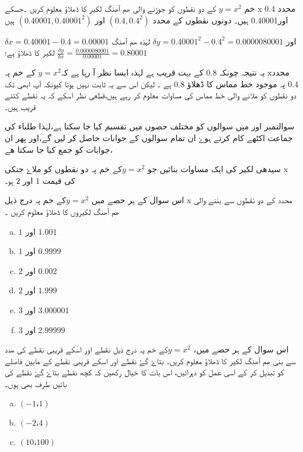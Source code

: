خم \( y=x^{2}\) کے دو نقطوں کو جوڑنے والی ھم آھنگ لکیر کا ڈھلاؤ معلوم کریں ۔جسکے x محدد 0.4 اور0.40001 ہیں۔
دونوں نقطوں کے محدد  \( ( 0.4,0.4^{2} ) \)  اور            \( (0.40001 , 0.40001^{2}) \)           ہیں 

\( \delta x = 0.40001-0.4=0.00001\)  اور   \(\delta y =0.40001^{2}-0.4^{2}=0.0000080001\)
لہٰذہ ھم آھنگ لکیر کا ڈھلاؤ ہے؛
      \(\frac{\delta y}{\delta x}=\frac{0.0000080001}{0.00001}=0.80001\)          

یہ نتیجہ چونکہ 0.8 کے بہت قریب ہے لہٰذہ ایسا نظر آ رہا ہے کہ\( y=x^{2} \) کے خم پہ xمحدد  0.4 پہ موجود     خط مماس کا ڈھلاؤ  0.8 ہے ۔ لیکن اس سے یہ ثابت نہیں ہوتا کیونکہ آپ ابھی تک دو نقطوں کو ملانے والی خط مماس کی مساوات معلوم کر رہے ہیں،قطعی نظر اسکے کہ یہ نقطے کتنے قریب ہیں۔


سوالنمبر اور میں سوالوں کو مختلف حصوں میں تقسیم کیا جا سکتا ہے،لہٰذا طلباء کی جماعت اکٹھے کام کرتے ہوۓ ان تمام سوالوں کے جوابات حاصل کر لیں گے،اور پھر ان جوابات کو جمع کیا جا سکتا ھے،

سیدھی لکیر کی ایک مساوات بنائیں جو \( y=x^{2} \)کے خم پہ دو نقطوں کو ملاۓ جنکی x کی قیمت 1 اور 2 ہو۔




اس سوال کے ہر حصے میں  \( y=x^{2} \)کے خم پہ  درج ذیل  x محدد  کے  دو نقطوں  سے بننے والی ھم آھنگ لکیروں کا ڈھلاؤ معلوم کریں ۔
   \begin{multicols}{2}
\begin{enumerate}[a.]
\item \(1  \) اور \(1.001 \)
\item \( 1\) اور \(    0.9999  \)
\item \( 2 \) اور \(0.002  \)
\item \( 2 \) اور \( 1.999 \)
\item \( 3 \) اور \(  3.000001\)
\item \( 3 \) اور \( 2.99999 \)
\end{enumerate}
\end{multicols}
 

اس سوال کے ہر حصے میں، \( y=x^{2} \)کے خم پہ درج ذیل نقطے اور اسکے قریبی نقطے کی مدد سے بنی    ھم آھنگ لکیر کا ڈھلاؤ معلوم کریں۔ بتاۓ گۓ نقطے اور اسکے قریبی نقطے کے مابین فاصلے کو تبدیل کر کے اسی عمل کو دہرائیں، اس بات کا خیال رکھیں کہ کچھ نقطے بتاۓ گۓ نقطے کی بائیں طرف بھی ہوں۔
\begin{multicols}{3}
\begin{enumerate}[a.]
\item \( (-1،1)   \)
\item \( (-2،4) \)
\item \((10،100)  \)
 \end{enumerate}
\end{multicols}
 


